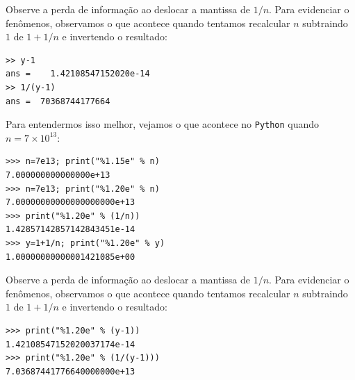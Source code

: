 \begin{ex}
\begin{verbatim}
\end{verbatim}
Observe a perda de informação ao deslocar a mantissa de $1/n$. Para evidenciar o fenômenos, observamos o que acontece quando tentamos recalcular $n$ subtraindo $1$ de $1+1/n$ e invertendo o resultado:
\begin{verbatim}
>> y-1
ans =    1.42108547152020e-14
>> 1/(y-1)
ans =  70368744177664
\end{verbatim}
\fi
\ifispython
Para entendermos isso melhor, vejamos o que acontece no \verb+Python+ quando $n=7\times 10^{13}$:
\begin{verbatim}
>>> n=7e13; print("%1.15e" % n)
7.000000000000000e+13
>>> n=7e13; print("%1.20e" % n)
7.00000000000000000000e+13
>>> print("%1.20e" % (1/n))
1.42857142857142843451e-14
>>> y=1+1/n; print("%1.20e" % y)
1.00000000000001421085e+00
\end{verbatim}
Observe a perda de informação ao deslocar a mantissa de $1/n$. Para evidenciar o fenômenos, observamos o que acontece quando tentamos recalcular $n$ subtraindo $1$ de $1+1/n$ e invertendo o resultado:
\begin{verbatim}
>>> print("%1.20e" % (y-1))
1.42108547152020037174e-14
>>> print("%1.20e" % (1/(y-1)))
7.03687441776640000000e+13
\end{verbatim}
\fi
\end{ex}

